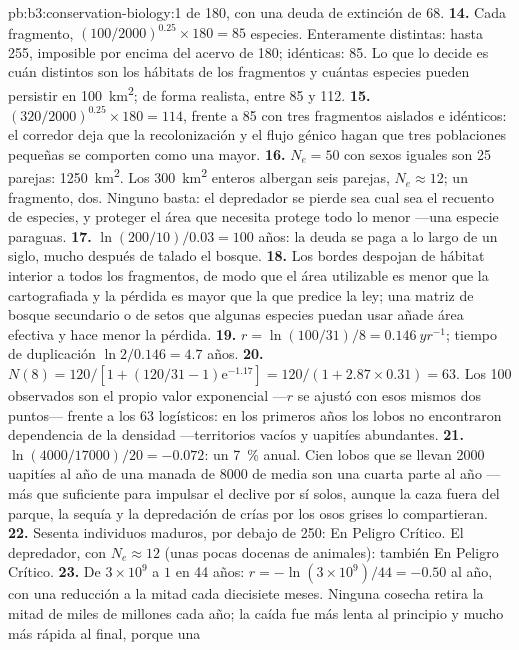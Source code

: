 \begin{solution}{pb:b3:conservation-biology:1}
de 180, con una deuda de extinción de 68.
\textbf{14.} Cada fragmento, $(100/2000)^{0.25}\times 180 = 85$
especies. Enteramente distintas: hasta 255, imposible por encima del
acervo de 180; idénticas: 85. Lo que lo decide es cuán distintos son
los hábitats de los fragmentos y cuántas especies pueden persistir en
\qty{100}{km^2}; de forma realista, entre 85 y 112.
\textbf{15.} $(320/2000)^{0.25}\times 180 = 114$, frente a 85 con tres
fragmentos aislados e idénticos: el corredor deja que la
recolonización y el flujo génico hagan que tres poblaciones pequeñas se
comporten como una mayor.
\textbf{16.} $N_{e} = 50$ con sexos iguales son 25 parejas:
\qty{1250}{km^2}. Los \qty{300}{km^2} enteros albergan seis parejas,
$N_{e} \approx 12$; un fragmento, dos. Ninguno basta: el depredador se
pierde sea cual sea el recuento de especies, y proteger el área que
necesita protege todo lo menor ---una especie paraguas.
\textbf{17.} $\ln(200/10)/0.03 = 100$ años: la deuda se paga a lo largo
de un siglo, mucho después de talado el bosque.
\textbf{18.} Los bordes despojan de hábitat interior a todos los
fragmentos, de modo que el área utilizable es menor que la
cartografiada y la pérdida es mayor que la que predice la ley; una
matriz de bosque secundario o de setos que algunas especies puedan usar
añade área efectiva y hace menor la pérdida.
\textbf{19.} $r = \ln(100/31)/8 = \qty{0.146}{yr^{-1}}$; tiempo de
duplicación $\ln 2/0.146 = 4.7$ años.
\textbf{20.} $N(8) = 120/[1 + (120/31 - 1)\mathrm{e}^{-1.17}] = 120/(1 +
2.87\times 0.31) = 63$. Los 100 observados son el propio valor
exponencial ---$r$ se ajustó con esos mismos dos puntos--- frente a los
63 logísticos: en los primeros años los lobos no encontraron
dependencia de la densidad ---territorios vacíos y uapitíes
abundantes.
\textbf{21.} $\ln(4000/\num{17000})/20 = -0.072$: un \qty{7}{\%} anual.
Cien lobos que se llevan \num{2000} uapitíes al año de una manada de
\num{8000} de media son una cuarta parte al año ---más que suficiente
para impulsar el declive por sí solos, aunque la caza fuera del parque,
la sequía y la depredación de crías por los osos grises lo
compartieran.
\textbf{22.} Sesenta individuos maduros, por debajo de 250: En Peligro
Crítico. El depredador, con $N_{e} \approx 12$ (unas pocas docenas de
animales): también En Peligro Crítico.
\textbf{23.} De $3\times 10^{9}$ a $1$ en 44 años: $r = -\ln(3\times
10^{9})/44 = -0.50$ al año, con una reducción a la mitad cada diecisiete
meses. Ninguna cosecha retira la mitad de miles de millones cada año; la
caída fue más lenta al principio y mucho más rápida al final, porque una

\end{solution}
